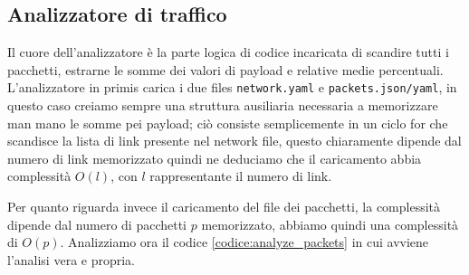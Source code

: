 \documentclass[binding=0.6cm]{sapthesis}
\begin{document}
\subsection{Analizzatore di traffico}
Il cuore dell'analizzatore è la parte logica di codice incaricata di scandire tutti i pacchetti, 
estrarne le somme dei valori di payload e relative medie percentuali.
L'analizzatore in primis carica i due files \texttt{network.yaml} e \texttt{packets.json/yaml}, 
in questo caso creiamo sempre una struttura ausiliaria necessaria a memorizzare man mano le somme pei payload; ciò 
consiste semplicemente in un ciclo for che scandisce la lista di link presente nel network file, questo chiaramente dipende dal numero di link
memorizzato quindi ne deduciamo che il caricamento abbia complessità \(O(l)\), con \(l\) rappresentante il numero di link.

Per quanto riguarda invece il caricamento del file dei pacchetti, la complessità dipende dal numero di pacchetti \(p\) memorizzato, abbiamo
quindi una complessità di \(O(p)\).
Analizziamo ora il codice \ref{codice:analyze_packets} in cui avviene l'analisi vera e propria.
\end{document}

